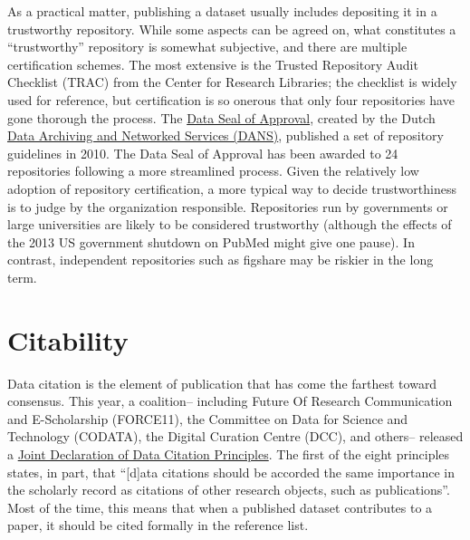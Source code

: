\documentclass[10pt,twocolumn]{article}
\begin{document}
As a practical matter, publishing a dataset usually includes depositing it in a trustworthy repository.
While some aspects can be agreed on, what constitutes a ``trustworthy'' repository is somewhat subjective, and there are multiple certification schemes.
The most extensive is the Trusted Repository Audit Checklist (TRAC)\cite{dale_trustworthy_2007} from the Center for Research Libraries; the checklist is widely used for reference, but certification is so onerous that only four repositories have gone thorough the process. %
The \href{http://datasealofapproval.org/}{Data Seal of Approval}, created by the Dutch \href{http://www.dans.knaw.nl/en}{Data Archiving and Networked Services (DANS)}, published a set of repository guidelines in 2010. 
The Data Seal of Approval has been awarded to 24 repositories following a more streamlined process.
Given the relatively low adoption of repository certification, a more typical way to decide trustworthiness is to judge by the organization responsible.
Repositories run by governments or large universities are likely to be considered trustworthy (although the effects of the 2013 US government shutdown on PubMed might give one pause). %
In contrast, independent repositories such as figshare may be riskier in the long term. %

\section*{Citability}\label{citability}

Data citation is the element of publication that has come the farthest toward consensus.
This year, a coalition– including Future Of Research Communication and E-Scholarship (FORCE11)\cite{bourne_improving_2012}, the Committee on Data for Science and Technology (CODATA)\cite{codata-icsti_task_group_on_data_citation_standards_and_practices_out_2013}, the Digital Curation Centre (DCC), and others– released a \href{http://www.force11.org/datacitation}{Joint Declaration of Data Citation Principles}.
The first of the eight principles states, in part, that ``[d]ata citations should be accorded the same importance in the scholarly record as citations of other research objects, such as publications''.
Most of the time, this means that when a published dataset contributes to a paper, it should be cited formally in the reference list.
	
\end{document}
